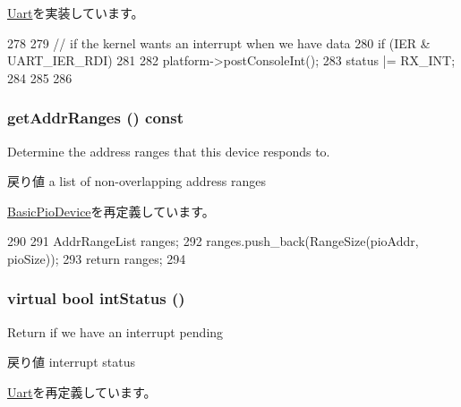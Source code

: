 \hyperlink{classUart_a8e0026e4db90ce7efbddf2835f411b0b}{Uart}を実装しています。


\begin{DoxyCode}
278 {
279     // if the kernel wants an interrupt when we have data
280     if (IER & UART_IER_RDI)
281     {
282         platform->postConsoleInt();
283         status |= RX_INT;
284     }
285 
286 }
\end{DoxyCode}
\hypertarget{classUart8250_a36cf113d5e5e091ebddb32306c098fae}{
\subsubsection[{getAddrRanges}]{ getAddrRanges () const}}
\label{classUart8250_a36cf113d5e5e091ebddb32306c098fae}
Determine the address ranges that this device responds to.

\begin{DoxyReturn}{戻り値}
a list of non-\/overlapping address ranges 
\end{DoxyReturn}


\hyperlink{classBasicPioDevice_a36cf113d5e5e091ebddb32306c098fae}{BasicPioDevice}を再定義しています。


\begin{DoxyCode}
290 {
291     AddrRangeList ranges;
292     ranges.push_back(RangeSize(pioAddr, pioSize));
293     return ranges;
294 }
\end{DoxyCode}
\hypertarget{classUart8250_a57f9c26cb4108beccb35bb1938990932}{
\subsubsection[{intStatus}]{\setlength{\rightskip}{0pt plus 5cm}virtual bool intStatus ()}}
\label{classUart8250_a57f9c26cb4108beccb35bb1938990932}
Return if we have an interrupt pending \begin{DoxyReturn}{戻り値}
interrupt status 
\end{DoxyReturn}


\hyperlink{classUart_a73c7d9c634e4c31cda71a6dd2fa67381}{Uart}を再定義しています。


